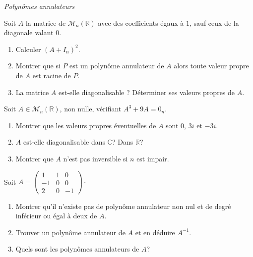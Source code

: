 \documentclass[a4paper,10pt]{report}
\begin{document}
\medskip

\begin{center}
\textit{{ {\large Polynômes annulateurs}}}
\end{center}

\medskip

\begin{Exercice}{} Soit $A$ la matrice de $\mathcal{M}_n(\mathbb{R})$ avec des coefficients égaux à $1$, sauf ceux de la diagonale valant $0$.

\begin{enumerate}
\item Calculer $(A+I_n)^2$.
\item Montrer que si $P$ est un polynôme annulateur de $A$ alors toute valeur propre de $A$ est racine de $P$.
\item La matrice $A$ est-elle diagonalisable ? Déterminer ses valeurs propres de $A$. 
\end{enumerate}
\end{Exercice}


\begin{Exercice}{} Soit $A \in \mathcal{M}_n(\mathbb{R})$, non nulle, vérifiant $A^3+9A=0_n$.
\begin{enumerate}
\item Montrer que les valeurs propres éventuelles de $A$ sont $0$, $3i$ et $-3i$.
\item $A$ est-elle diagonalisable dans $\mathbb{C}$? Dans $\mathbb{R}$?
\item Montrer que $A$ n'est pas inversible si $n$ est impair. 
\end{enumerate}
\end{Exercice}



\begin{Exercice}{} Soit $A = \begin{pmatrix}
1 & 1 & 0 \\
-1 & 0 & 0 \\
2 & 0 & -1 
\end{pmatrix}\cdot$
\begin{enumerate}
\item Montrer qu'il n'existe pas de polynôme annulateur non nul et de degré inférieur ou égal à deux de $A$.
\item Trouver un polynôme annulateur de $A$ et en déduire $A^{-1}$.
\item Quels sont les polynômes annulateurs de $A$?
\end{enumerate}
\end{Exercice}
\end{document}
